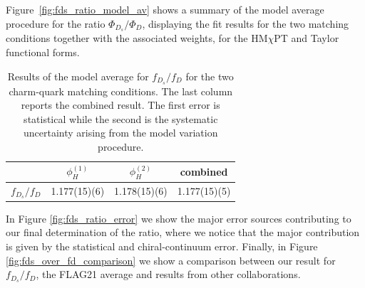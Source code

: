  Figure~\ref{fig:fds_ratio_model_av}
shows a summary of the model average procedure for the ratio $\Phi_{D_s}/\Phi_D$, displaying the fit results for the two 
matching conditions together with the associated weights, for the HM$\chi$PT and Taylor functional forms.

\begin{table}[t!]
	\begin{center}	
		\begin{tabular}{c ||  c c  c}
			\hline
			 &  $\phi_{H}^{(1)}$ & $\phi_{H}^{(2)} $   & combined \\ [0.5ex]
			\hline\hline
			$f_{D_s}/f_D$   &  1.177(15)(6)& 1.178(15)(6) &  1.177(15)(5)
		\end{tabular}
		\caption{Results of the model average for $f_{D_s}/f_D$ for the two charm-quark matching conditions. The last column reports the combined result. The first error is statistical while the second is the systematic uncertainty arising from the model variation procedure. }
		\label{tab:ratio_res_all_matching}
	\end{center}
\end{table}
  In Figure \ref{fig:fds_ratio_error}  we show the major error sources contributing to our final determination of the ratio, where we notice that the major contribution is given by the statistical and chiral-continuum error. Finally, in Figure \ref{fig:fds_over_fd_comparison} we show a comparison between our result for $f_{D_s}/f_D$, the FLAG21 average and results from other collaborations.


